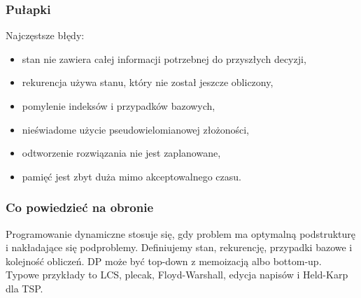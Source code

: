 \subsubsection{Pułapki}

Najczęstsze błędy:
\begin{itemize}
  \item stan nie zawiera całej informacji potrzebnej do przyszłych decyzji,
  \item rekurencja używa stanu, który nie został jeszcze obliczony,
  \item pomylenie indeksów i przypadków bazowych,
  \item nieświadome użycie pseudowielomianowej złożoności,
  \item odtworzenie rozwiązania nie jest zaplanowane,
  \item pamięć jest zbyt duża mimo akceptowalnego czasu.
\end{itemize}

\subsubsection{Co powiedzieć na obronie}

Programowanie dynamiczne stosuje się, gdy problem ma optymalną podstrukturę i nakładające się podproblemy. Definiujemy stan, rekurencję, przypadki bazowe i kolejność obliczeń. DP może być top-down z memoizacją albo bottom-up. Typowe przykłady to LCS, plecak, Floyd-Warshall, edycja napisów i Held-Karp dla TSP.
